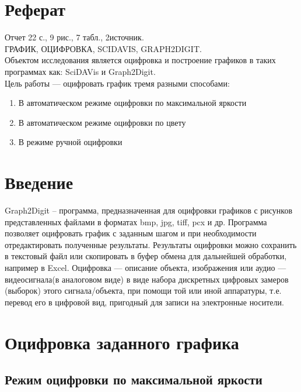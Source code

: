 \documentclass[a4paper,14pt,russian]{report}
\begin{document}


\newpage
{}
\setcounter{page}{2}

\section*{Реферат}

\noindent Отчет 22 с., 9 рис., 7 табл., 2источник. \\
ГРАФИК, ОЦИФРОВКА, SCIDAVIS, GRAPH2DIGIT. \\
Объектом исследования является оцифровка и построение графиков в таких программах как: SciDAVis и Graph2Digit. \\
Цель работы — оцифровать график тремя разными способами:

\begin{enumerate}
  \item В автоматическом режиме оцифровки по максимальной яркости
  \item В автоматическом режиме оцифровки по цвету
  \item В режиме ручной оцифровки
\end{enumerate}

\tableofcontents

\section{Введение}

Graph2Digit – программа, предназначенная для оцифровки графиков с рисунков представленных файлами в форматах bmp, jpg, tiff, pcx и др. Программа позволяет оцифровать график с заданным шагом и при необходимости отредактировать полученные результаты. Результаты оцифровки можно сохранить в текстовый файл или скопировать в буфер обмена для дальнейшей обработки, например в Excel. Оцифровка — описание объекта, изображения или аудио — видеосигнала(в аналоговом виде) в виде набора дискретных цифровых замеров (выборок) этого сигнала/объекта, при помощи той или иной аппаратуры, т.е. перевод его в цифровой вид, пригодный для записи на электронные носители.

\section{Оцифровка заданного графика}

\subsection{Режим оцифровки по максимальной яркости}
\end{document}
